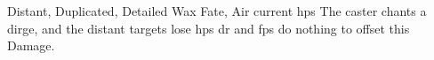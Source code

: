  {Distant, Duplicated, Detailed}%
  {Wax}%
  {Fate, Air}%
  {current \glspl{hp}}%
  {The caster chants a dirge, and the distant targets lose  \glspl{hp}}%
  {\gls{dr} and \glspl{fp} do nothing to offset this Damage.}
